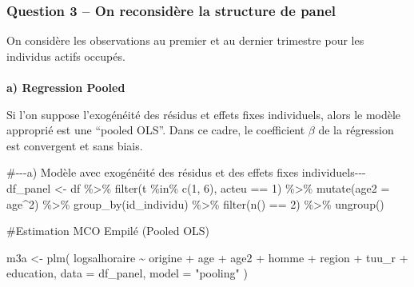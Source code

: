 \documentclass[
  letterpaper,
  DIV=11,
  numbers=noendperiod]{scrartcl}
\makeatletter
\let\oldparagraph\paragraph
\renewcommand{\paragraph}{
    \@ifstar
      \xxxParagraphStar
      \xxxParagraphNoStar
  }
\newcommand{\xxxParagraphStar}[1]{\oldparagraph*{#1}\mbox{}}
\newcommand{\xxxParagraphNoStar}[1]{\oldparagraph{#1}\mbox{}}
\newenvironment{Shaded}{\begin{snugshade}}{\end{snugshade}}
\newcommand{\AttributeTok}[1]{\textcolor[rgb]{0.40,0.45,0.13}{#1}}
\newcommand{\CommentTok}[1]{\textcolor[rgb]{0.37,0.37,0.37}{#1}}
\newcommand{\DecValTok}[1]{\textcolor[rgb]{0.68,0.00,0.00}{#1}}
\newcommand{\FunctionTok}[1]{\textcolor[rgb]{0.28,0.35,0.67}{#1}}
\newcommand{\NormalTok}[1]{\textcolor[rgb]{0.00,0.23,0.31}{#1}}
\newcommand{\OtherTok}[1]{\textcolor[rgb]{0.00,0.23,0.31}{#1}}
\newcommand{\SpecialCharTok}[1]{\textcolor[rgb]{0.37,0.37,0.37}{#1}}
\newcommand{\StringTok}[1]{\textcolor[rgb]{0.13,0.47,0.30}{#1}}
\makeatother
\begin{document}
\subsubsection{Question 3 -- On reconsidère la structure de
panel}\label{question-3-on-reconsiduxe8re-la-structure-de-panel}

On considère les observations au premier et au dernier trimestre pour
les individus actifs occupés.

\paragraph{\texorpdfstring{\textbf{a) Regression
Pooled}}{a) Regression Pooled}}\label{a-regression-pooled}

Si l'on suppose l'exogénéité des résidus et effets fixes individuels,
alors le modèle approprié est une ``pooled OLS''. Dans ce cadre, le
coefficient \(\beta\) de la régression est convergent et sans biais.

\begin{Shaded}
\begin{Highlighting}[]
 \CommentTok{\#{-}{-}{-}a) Modèle avec exogénéité des résidus et des effets fixes individuels{-}{-}{-}}
\NormalTok{df\_panel }\OtherTok{\textless{}{-}}\NormalTok{ df }\SpecialCharTok{\%\textgreater{}\%}
  \FunctionTok{filter}\NormalTok{(t }\SpecialCharTok{\%in\%} \FunctionTok{c}\NormalTok{(}\DecValTok{1}\NormalTok{, }\DecValTok{6}\NormalTok{), acteu }\SpecialCharTok{==} \DecValTok{1}\NormalTok{) }\SpecialCharTok{\%\textgreater{}\%}
  \FunctionTok{mutate}\NormalTok{(}\AttributeTok{age2 =}\NormalTok{ age}\SpecialCharTok{\^{}}\DecValTok{2}\NormalTok{) }\SpecialCharTok{\%\textgreater{}\%}
  \FunctionTok{group\_by}\NormalTok{(id\_individu) }\SpecialCharTok{\%\textgreater{}\%}
  \FunctionTok{filter}\NormalTok{(}\FunctionTok{n}\NormalTok{() }\SpecialCharTok{==} \DecValTok{2}\NormalTok{) }\SpecialCharTok{\%\textgreater{}\%}
  \FunctionTok{ungroup}\NormalTok{()}

      \CommentTok{\#Estimation MCO Empilé (Pooled OLS)}

\NormalTok{m3a }\OtherTok{\textless{}{-}} \FunctionTok{plm}\NormalTok{(}
\NormalTok{  logsalhoraire }\SpecialCharTok{\textasciitilde{}}\NormalTok{ origine }\SpecialCharTok{+}\NormalTok{ age }\SpecialCharTok{+}\NormalTok{ age2 }\SpecialCharTok{+}\NormalTok{ homme }\SpecialCharTok{+}\NormalTok{ region }\SpecialCharTok{+}\NormalTok{ tuu\_r }\SpecialCharTok{+}\NormalTok{ education,}
  \AttributeTok{data =}\NormalTok{ df\_panel,}
  \AttributeTok{model =} \StringTok{"pooling"}
\NormalTok{)}
\end{Highlighting}
\end{Shaded}
\end{document}
